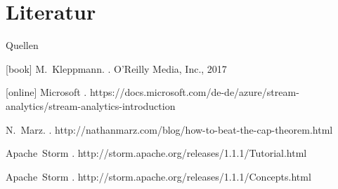 \documentclass{beamer}
\begin{document}
\section{Literatur}
\begin{frame}[t]{Quellen}
\begin{thebibliography}{Kleppmann, 2017}
[book]
M.~Kleppmann.
.
\newblock \small{O'Reilly Media, Inc., 2017}

[online]
  Microsoft
.
\newblock https://docs.microsoft.com/de-de/azure/stream-analytics/stream-analytics-introduction 

N.~Marz.
.
\newblock http://nathanmarz.com/blog/how-to-beat-the-cap-theorem.html 

Apache~Storm
.
\newblock http://storm.apache.org/releases/1.1.1/Tutorial.html 

Apache~Storm
.
\newblock http://storm.apache.org/releases/1.1.1/Concepts.html

\end{thebibliography}
\end{frame}
\end{document}
